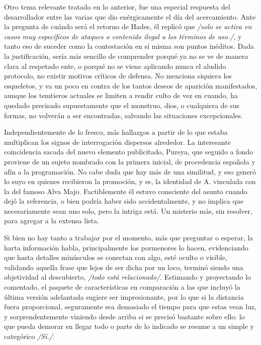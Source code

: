 \documentclass[
]{book}
\begin{document}
Otro tema relevante tratado en lo anterior, fue una especial respuesta del desarrollador entre las varias que dio enérgicamente el día del acercamiento. Ante la pregunta de cuándo será el retorno de Hades, él replicó que \emph{/solo se activa en casos muy específicos de ataques o contenido ilegal a los términos de uso./}, y tanto eso de suceder como la contestación en sí misma son puntos inéditos. Dada la justificación, sería más sencillo de comprender porqué ya no se ve de manera clara al respetado ente, o porqué no se viene aplicando nunca el aludido protocolo, no existir motivos críticos de defensa. No menciona siquiera los esqueletos, y va un poco en contra de los tantos deseos de aparición manifestados, aunque los temtieros actuales se limiten a rendir culto de vez en cuando, ha quedado precisado supuestamente que el monstruo, dios, o cualquiera de sus formas, no volverán a ser encontradas, salvando las situaciones excepcionales.

Independientemente de lo fresco, más hallazgos a partir de lo que estaba multiplican los signos de interrogación dispersos alrededor. La interesante coincidencia sacada del nuevo elemento publicitado, Pureya, que seguido a fondo proviene de un sujeto nombrado con la primera inicial, de procedencia española y afín a la programación. No cabe duda que hay más de una similitud, y eso generó lo suyo en quienes recibieron la promoción, y es, la identidad de A. vinculada con la del famoso Alva Majo. Factiblemente él estuvo consciente del asunto cuando dejó la referencia, o bien podría haber sido accidentalmente, y no implica que necesariamente sean uno solo, pero la intriga está. Un misterio más, sin resolver, para agregar a la extensa lista.

Si bien no hay tanto a trabajar por el momento, más que preguntar o esperar, la harta información habla, principalmente los pormenores lo hacen, evidenciando que hasta detalles minúsculos se conectan con algo, esté oculto o visible, validando aquella frase que lejos de ser dicha por un loco, terminó siendo una objetividad al descubierto, \emph{/todo está relacionado/}. Estimando y proyectando lo comentado, el paquete de características en comparación a las que incluyó la última versión adelantada sugiere ser impresionante, por lo que si la distancia fuera proporcional, seguramente sea demasiado el tiempo para que estas vean luz, y sorprendentemente viniendo desde arriba si se precisó bastante sobre ello: lo que pueda demorar en llegar todo o parte de lo indicado se resume a un simple y categórico \emph{/Sí./}.
\end{document}
